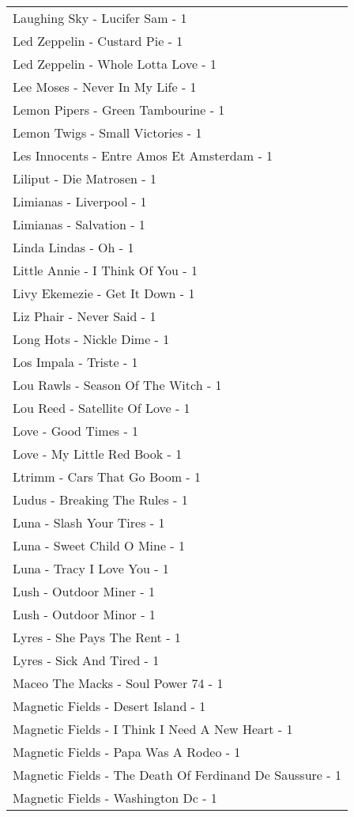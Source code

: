 \documentclass[
]{article}
\begin{document}
\begin{longtable}{l}
Laughing Sky - Lucifer Sam - 1 \\ 
Led Zeppelin - Custard Pie - 1 \\ 
Led Zeppelin - Whole Lotta Love - 1 \\ 
Lee Moses - Never In My Life - 1 \\ 
Lemon Pipers - Green Tambourine - 1 \\ 
Lemon Twigs - Small Victories - 1 \\ 
Les Innocents - Entre Amos Et Amsterdam - 1 \\ 
Liliput - Die Matrosen - 1 \\ 
Limianas - Liverpool - 1 \\ 
Limianas - Salvation - 1 \\ 
Linda Lindas - Oh - 1 \\ 
Little Annie - I Think Of You - 1 \\ 
Livy Ekemezie - Get It Down - 1 \\ 
Liz Phair - Never Said - 1 \\ 
Long Hots - Nickle Dime - 1 \\ 
Los Impala - Triste - 1 \\ 
Lou Rawls - Season Of The Witch - 1 \\ 
Lou Reed - Satellite Of Love - 1 \\ 
Love - Good Times - 1 \\ 
Love - My Little Red Book - 1 \\ 
Ltrimm - Cars That Go Boom - 1 \\ 
Ludus - Breaking The Rules - 1 \\ 
Luna - Slash Your Tires - 1 \\ 
Luna - Sweet Child O Mine - 1 \\ 
Luna - Tracy I Love You - 1 \\ 
Lush - Outdoor Miner - 1 \\ 
Lush - Outdoor Minor - 1 \\ 
Lyres - She Pays The Rent - 1 \\ 
Lyres - Sick And Tired - 1 \\ 
Maceo The Macks - Soul Power 74 - 1 \\ 
Magnetic Fields - Desert Island - 1 \\ 
Magnetic Fields - I Think I Need A New Heart - 1 \\ 
Magnetic Fields - Papa Was A Rodeo - 1 \\ 
Magnetic Fields - The Death Of Ferdinand De Saussure - 1 \\ 
Magnetic Fields - Washington Dc - 1 \\ 

\end{longtable}
\end{document}
